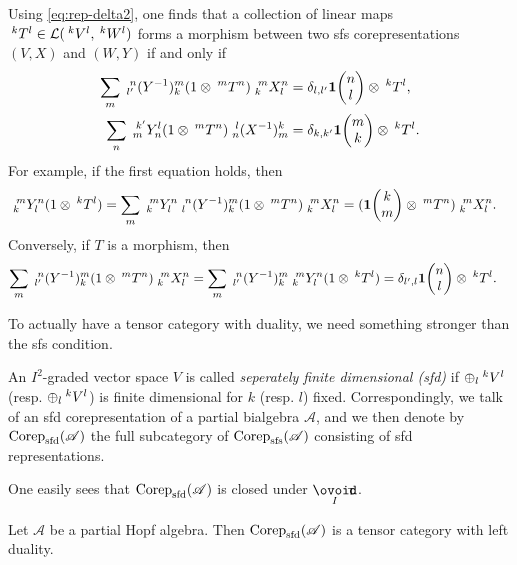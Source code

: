  \begin{Rem}\label{RemMorRep} %
 Using \eqref{eq:rep-delta2}, one finds that a collection of linear maps $\Gru{T}{k}{l} \in
\mathcal{L}(\Gru{V}{k}{l},\Gru{W}{k}{l})$ forms a morphism between two sfs corepresentations
$(V,X)$ and $(W,Y)$  if
and only if
  \begin{align} 
    \sum_{m} \Gr{(Y^{-1})}{n}{m}{l'}{k}(1 \otimes
    \Gru{T}{m}{n})\Gr{X}{m}{n}{k}{l} &= \delta_{l,l'}
    \UnitC{n}{l} \otimes \Gru{T}{k}{l}, \\
    \sum_{n} \Gr{Y}{k'}{l}{m}{n}(1 \otimes
    \Gru{T}{m}{n})\Gr{(X^{-1})}{l}{k}{n}{m} &= \delta_{k,k'}
    \UnitC{m}{k} \otimes \Gru{T}{k}{l}.
 \end{align}
For example, if the first equation holds, then
\begin{align*}
  \Gr{Y}{m}{n}{k}{l} (1 \otimes \Gru{T}{k}{l}) &=
  \sum_{m}  \Gr{Y}{m}{n}{k}{l} \Gr{(Y^{-1})}{n}{m}{l}{k}(1 \otimes
  \Gru{T}{m}{n})\Gr{X}{m}{n}{k}{l} = (\UnitC{k}{m}\otimes \Gru{T}{m}{n})\Gr{X}{m}{n}{k}{l}.
\end{align*}
Conversely, if $T$ is a morphism, then
\begin{align*}
  \sum_{m} \Gr{(Y^{-1})}{n}{m}{l'}{k}(1 \otimes
  \Gru{T}{m}{n})\Gr{X}{m}{n}{k}{l} &= \sum_{m}
  \Gr{(Y^{-1})}{n}{m}{l'}{k} \Gr{Y}{m}{n}{k}{l}(1 \otimes
  \Gru{T}{k}{l}) = \delta_{l',l} \UnitC{n}{l} \otimes
  \Gru{T}{k}{l}.
\end{align*}
\end{Rem}

To actually have a tensor category with duality, we need something stronger than the sfs condition.

\begin{Def} An $I^2$-graded vector space $V$ is called \emph{seperately finite dimensional (sfd)} if $\oplus_l \Gru{V}{k}{l}$ (resp. $\oplus_l \Gru{V}{k}{l}$) is finite dimensional for $k$ (resp. $l$) fixed. Correspondingly, we talk of an sfd corepresentation of a partial bialgebra $\mathscr{A}$, and we then denote by $\Corep_{\sfd}(\mathscr{A})$ the full subcategory of $\Corep_{\sfs}(\mathscr{A})$ consisting of sfd representations. 
\end{Def} 

One easily sees that $\Corep_{\sfd}(\mathscr{A})$ is closed under $\Circt$. 

\begin{Lem} Let $\mathscr{A}$ be a partial Hopf algebra. Then $\Corep_{\sfd}(\mathscr{A})$ is a tensor category with left duality. 
\end{Lem} 

